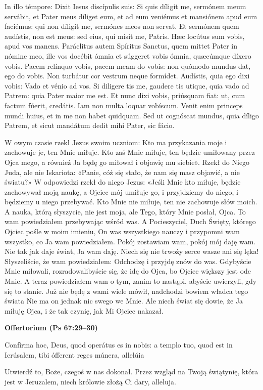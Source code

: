 \documentclass[10pt,a5paper]{book}
\newcommand{\oremus}[3]{\medskip\centerline{\textbf{#1}}\medskip
	\begin{sloppypar}
		\begin{paracol}{2}
			\setlength{\columnsep}{0em}
			\begin{leftcolumn}
				#2
			\end{leftcolumn}
			\begin{rightcolumn}
				#3
			\end{rightcolumn}
		\end{paracol}
	\end{sloppypar}}
\newcommand{\oremuss}[2]{
	\begin{sloppypar}
		\begin{paracol}{2}
			\setlength{\columnsep}{0em}
			\begin{leftcolumn}
				#1
			\end{leftcolumn}
			\begin{rightcolumn}
				#2
			\end{rightcolumn}
		\end{paracol}
	\end{sloppypar}}
\begin{document}
\oremuss{In illo témpore: Dixit Iesus discípulis suis: Si quis díligit me,
	sermónem meum servábit, et Pater meus díliget eum, et ad eum veniémus et
	mansiónem apud eum faciémus: qui non díligit me, sermónes meos non servat.
	Et sermónem quem audístis, non est meus: sed eius, qui misit me, Patris. Hæc
	locútus sum vobis, apud vos manens. Paráclitus autem Spíritus Sanctus, quem
	mittet Pater in nómine meo, ille vos docébit ómnia et súggeret vobis ómnia,
	quæcúmque díxero vobis. Pacem relínquo vobis, pacem meam do vobis: non
	quómodo mundus dat, ego do vobis. Non turbátur cor vestrum neque formídet.
	Audístis, quia ego dixi vobis: Vado et vénio ad vos. Si diligere tis me,
	gaudere tis utique, quia vado ad Patrem: quia Pater maior me est. Et nunc
	dixi vobis, priúsquam fiat: ut, cum factum fúerit, credátis. Iam non multa
	loquar vobíscum. Venit enim princeps mundi huius, et in me non habet
	quidquam. Sed ut cognóscat mundus, quia díligo Patrem, et sicut mandátum
	dedit mihi Pater, sic fácio.}{\vspace*{-3pt} W owym czasie rzekł Jezus swoim
	uczniom: Kto ma przykazania moje i zachowuje je, ten Mnie miłuje. Kto zaś
	Mnie miłuje, ten będzie umiłowany przez Ojca mego, a również Ja będę go
	miłował i objawię mu siebie».  Rzekł do Niego Juda, ale nie Iskariota:
	«Panie, cóż się stało, że nam się masz objawić, a nie światu?» W odpowiedzi
	rzekł do niego Jezus: «Jeśli Mnie kto miłuje, będzie zachowywał moją naukę,
	a Ojciec mój umiłuje go, i przyjdziemy do niego, i będziemy u niego
	przebywać. Kto Mnie nie miłuje, ten nie zachowuje słów moich. A nauka, którą
	słyszycie, nie jest moja, ale Tego, który Mnie posłał, Ojca. To wam
	powiedziałem przebywając wśród was. A Pocieszyciel, Duch Święty, którego
	Ojciec pośle w moim imieniu, On was wszystkiego nauczy i przypomni wam
	wszystko, co Ja wam powiedziałem.  Pokój zostawiam wam, pokój mój daję wam.
	Nie tak jak daje świat, Ja wam daję. Niech się nie trwoży serce wasze ani
	się lęka!  Słyszeliście, że wam powiedziałem: Odchodzę i przyjdę znów do
	was. Gdybyście Mnie miłowali, rozradowalibyście się, że idę do Ojca, bo
	Ojciec większy jest ode Mnie. A teraz powiedziałem wam o tym, zanim to
	nastąpi, abyście uwierzyli, gdy się to stanie. Już nie będę z wami wiele
	mówił, nadchodzi bowiem władca tego świata Nie ma on jednak nic swego we
	Mnie. Ale niech świat się dowie, że Ja miłuję Ojca, i że tak czynię, jak Mi
	Ojciec nakazał.}

\oremus{Offertorium (Ps 67:29--30)}{Confírma hoc, Deus, quod operátus es in
	nobis: a templo tuo, quod est in Ierúsalem, tibi ófferent reges múnera,
	allelúia}{Utwierdź to, Boże, czegoś w nas dokonał. Przez wzgląd na Twoją
	świątynię, która jest w Jeruzalem, niech królowie złożą Ci dary, alleluja.}
\end{document}

